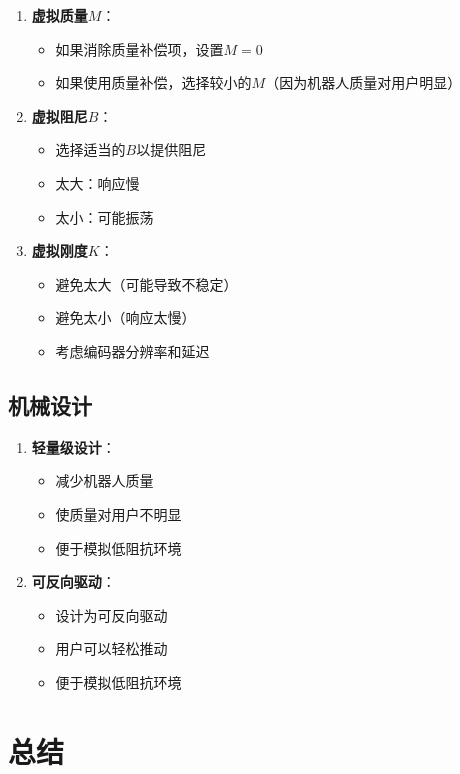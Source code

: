 \documentclass[12pt,a4paper]{article}
\begin{document}
\begin{enumerate}
\item \textbf{虚拟质量$M$}：
\begin{itemize}
\item 如果消除质量补偿项，设置$M = 0$
\item 如果使用质量补偿，选择较小的$M$（因为机器人质量对用户明显）
\end{itemize}

\item \textbf{虚拟阻尼$B$}：
\begin{itemize}
\item 选择适当的$B$以提供阻尼
\item 太大：响应慢
\item 太小：可能振荡
\end{itemize}

\item \textbf{虚拟刚度$K$}：
\begin{itemize}
\item 避免太大（可能导致不稳定）
\item 避免太小（响应太慢）
\item 考虑编码器分辨率和延迟
\end{itemize}
\end{enumerate}

\subsection{机械设计}

\begin{enumerate}
\item \textbf{轻量级设计}：
\begin{itemize}
\item 减少机器人质量
\item 使质量对用户不明显
\item 便于模拟低阻抗环境
\end{itemize}

\item \textbf{可反向驱动}：
\begin{itemize}
\item 设计为可反向驱动
\item 用户可以轻松推动
\item 便于模拟低阻抗环境
\end{itemize}
\end{enumerate}

\section{总结}
\end{document}
